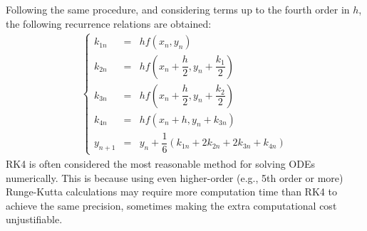 \documentclass[uplatex,a4j,12pt,dvipdfmx]{jsarticle}
\begin{document}
Following the same procedure,
and considering terms up to the fourth order in $h$,
the following recurrence relations are obtained:
\begin{eqnarray}
	\left\{
	\begin{array}{rcl}
		k_{1n}
		 & = &
		h f(x_{n},y_{n})
		\\[2mm]
		k_{2n}
		 & = &
		h f(x_{n}+\dfrac{h}{2},y_{n}+\dfrac{k_{1}}{2})
		\\[2mm]
		k_{3n}
		 & = &
		h f(x_{n}+\dfrac{h}{2},y_{n}+\dfrac{k_{2}}{2})
		\\[2mm]
		k_{4n}
		 & = &
		h f(x_{n}+h,y_{n}+k_{3n})
		\\[2mm]
		y_{n+1}
		 & = &
		y_{n} + \dfrac{1}{6} (k_{1n} + 2 k_{2n} + 2 k_{3n} + k_{4n})
	\end{array}
	\right.
\end{eqnarray}
RK4 is often considered the most reasonable method for solving ODEs numerically.
This is because using even higher-order (e.g., 5th order or more) Runge-Kutta calculations
may require more computation time than RK4 to achieve the same precision,
sometimes making the extra computational cost unjustifiable.
\end{document}
